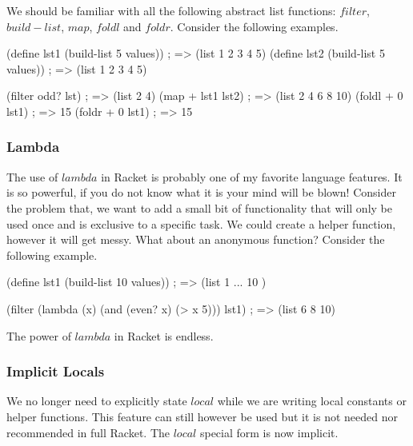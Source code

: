 We should be familiar with all the following abstract list functions: $filter$, $build-list$, $map$, $foldl$ and $foldr$. Consider the following examples.\\


\begin{code}[Lisp]
(define lst1 (build-list 5 values)) ; => (list 1 2 3 4 5)
(define lst2 (build-list 5 values)) ; => (list 1 2 3 4 5)

(filter odd? lst) ; => (list 2 4)
(map + lst1 lst2) ; => (list 2 4 6 8 10)
(foldl + 0 lst1) ; => 15
(foldr + 0 lst1) ; => 15
\end{code}

\subsubsection*{Lambda}

The use of $lambda$ in Racket is probably one of my favorite language features. It is so powerful, if you do not know what it is your mind will be blown! Consider the problem that, we want to add a small bit of functionality that will only be used once and is exclusive to a specific task. We could create a helper function, however it will get messy. What about an anonymous function? Consider the following example.\\


\begin{code}[Lisp]
(define lst1 (build-list 10 values)) ; => (list 1 ... 10 )

(filter (lambda (x) (and (even? x) (> x 5))) lst1) ; => (list 6 8 10)
\end{code}

The power of $lambda$ in Racket is endless.\\


\subsubsection*{Implicit Locals}

We no longer need to explicitly state $local$ while we are writing local constants or helper functions. This feature can still however be used but it is not needed nor recommended in full Racket. The $local$ special form is now implicit.

